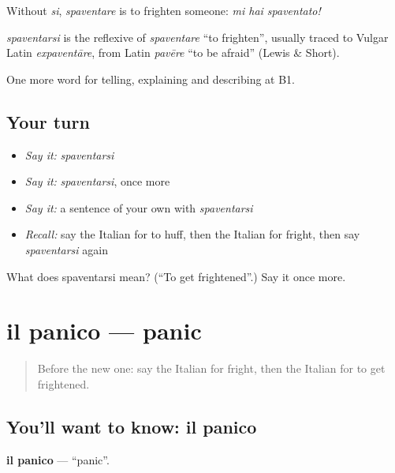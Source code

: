 Without \emph{si}, \emph{spaventare} is to frighten someone: \emph{mi hai spaventato!}

\begin{cousinweb}
\emph{spaventarsi} is the reflexive of \emph{spaventare} \textquotedblleft{}to frighten\textquotedblright{}, usually traced to Vulgar Latin \emph{expaventāre}, from Latin \emph{pavēre} \textquotedblleft{}to be afraid\textquotedblright{} (Lewis \& Short).
\end{cousinweb}

\begin{grammarlens}[title={What you've built}]
One more word for telling, explaining and describing at B1.
\end{grammarlens}

\subsection*{Your turn}
\begin{itemize}
\raggedright
  \item \emph{Say it:} \emph{spaventarsi}
  \item \emph{Say it:} \emph{spaventarsi}, once more
  \item \emph{Say it:} a sentence of your own with \emph{spaventarsi}
  \item \emph{Recall:} say the Italian for to huff, then the Italian for fright, then say \emph{spaventarsi} again
\end{itemize}

\begin{tcolorbox}[breakable,colback=teal!4,colframe=teal!35!black,title={Before you move on}]
What does spaventarsi mean? (\textquotedblleft{}To get frightened\textquotedblright{}.) Say it once more.
\end{tcolorbox}
\section[il panico]{il panico — panic}

\label{lesson:IT-C475-panico}



\begin{quote}
Before the new one: say the Italian for fright, then the Italian for to get frightened.
\end{quote}

\subsection*{You'll want to know: il panico}
\textbf{il panico} — \textquotedblleft{}panic\textquotedblright{}.

